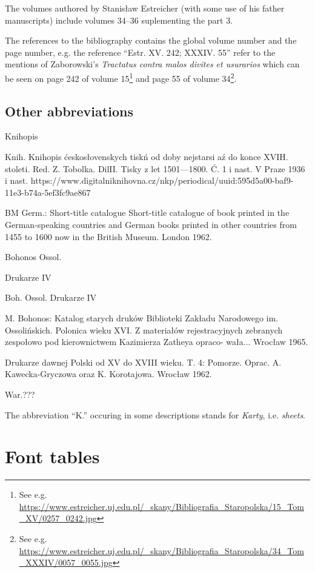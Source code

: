 \documentclass[12pt]{article}
\begin{document}
  The volumes authored by Stanisław Estreicher (with some use of his
  father manuscripts) include volumes 34--36 suplementing the part 3.

  The references to the bibliography contains the global volume number
  and the page number, e.g.  the reference ``Estr. XV. 242;
  XXXIV. 55'' refer to the mentions of Zaborowski's \textit{Tractatus
    contra malos divites et usurarios} which can be seen on page 242
  of volume 15\footnote{See e.g.
    \url{https://www.estreicher.uj.edu.pl/_skany/Bibliografia_Staropolska/15_Tom_XV/0257_0242.jpg}}
  and page 55 of volume 34\footnote{See e.g.
    \url{https://www.estreicher.uj.edu.pl/_skany/Bibliografia_Staropolska/34_Tom_XXXIV/0057_0055.jpg}}.

\subsection{Other abbreviations}
\label{sec:other-abbreviations}

Knihopis

Knih.
Knihopis ćeskosłovenskych tiskń od doby nejstarsi aź do konce XVIH.
stoleti. Red. Z. Tobolka. DilII. Tisky z let 1501—1800. Ć. 1 i nast. V Praze
1936 i nast.
https://www.digitalniknihovna.cz/nkp/periodical/uuid:595d5a00-baf9-11e3-b74a-5ef3fc9ae867

BM Germ.: Short-title catalogue
Short-title catalogue of book printed in the German-speaking countries
and German books printed in other countries from 1455 to 1600 now in
the British Museum. London 1962.

Bohonos Ossol.

Drukarze IV 

Boh. Ossol.
Drukarze IV

M. Bohonos: Katalog starych druków Biblioteki Zakładu Narodowego
im. Ossolińskich. Polonica wieku XVI. Z materiałów rejestracyjnych
zebranych zespołowo pod kierownictwem Kazimierza Zatheya opraco-
wała... Wrocław 1965.

Drukarze dawnej Polski od XV do XVIII wieku. T. 4: Pomorze. Oprac.
A. Kawecka-Gryczowa oraz K. Korotajowa. Wrocław 1962.

War.???

The abbreviation ``K.'' occuring in some descriptions stands for
\textit{Karty}, i.e. \textit{sheets}.

\newpage
\section{Font tables}
\label{sec:font-tables}
\end{document}
